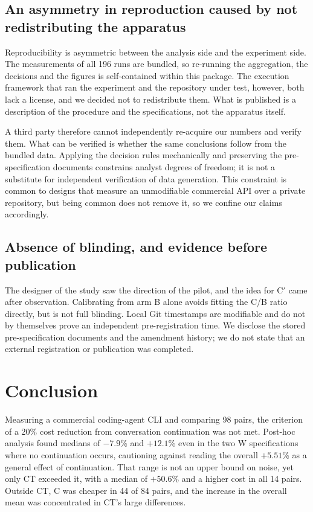 \documentclass[a4paper,11pt]{article}
\begin{document}
\subsection{An asymmetry in reproduction caused by not redistributing the apparatus}\label{sec:repro_limit}
Reproducibility is asymmetric between the analysis side and the experiment side. The measurements of all 196 runs are bundled, so re-running the aggregation, the decisions and the figures is self-contained within this package. The execution framework that ran the experiment and the repository under test, however, both lack a license, and we decided not to redistribute them. What is published is a description of the procedure and the specifications, not the apparatus itself.

A third party therefore cannot independently re-acquire our numbers and verify them. What can be verified is whether the same conclusions follow from the bundled data. Applying the decision rules mechanically and preserving the pre-specification documents constrains analyst degrees of freedom; it is not a substitute for independent verification of data generation. This constraint is common to designs that measure an unmodifiable commercial API over a private repository, but being common does not remove it, so we confine our claims accordingly.

\subsection{Absence of blinding, and evidence before publication}
The designer of the study saw the direction of the pilot, and the idea for C$'$ came after observation. Calibrating from arm B alone avoids fitting the C/B ratio directly, but is not full blinding. Local Git timestamps are modifiable and do not by themselves prove an independent pre-registration time. We disclose the stored pre-specification documents and the amendment history; we do not state that an external registration or publication was completed.

\section{Conclusion}\label{sec:conclusion}
Measuring a commercial coding-agent CLI and comparing 98 pairs, the criterion of a 20\% cost reduction from conversation continuation was not met. Post-hoc analysis found medians of $-7.9$\% and $+12.1$\% even in the two W specifications where no continuation occurs, cautioning against reading the overall $+5.51$\% as a general effect of continuation. That range is not an upper bound on noise, yet only CT exceeded it, with a median of $+50.6$\% and a higher cost in all 14 pairs. Outside CT, C was cheaper in 44 of 84 pairs, and the increase in the overall mean was concentrated in CT's large differences.
\end{document}
